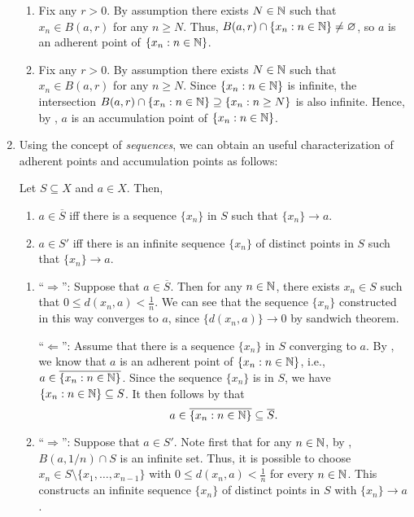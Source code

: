 \begin{enumerate}
\begin{pf}
\begin{enumerate}
\item Fix any \(r>0\). By assumption there exists \(N\in\mathbb{N}\) such that \(x_n\in
B(a,r)\) for any \(n\ge N\). Thus, \(B(a,r)\cap\{x_n:n\in\mathbb{N}\}\ne\varnothing\),
so \(a\) is an adherent point of \(\{x_n:n\in\mathbb{N}\}\).

\item Fix any \(r>0\). By assumption there exists \(N\in\mathbb{N}\) such that \(x_n\in
B(a,r)\) for any \(n\ge N\). Since \(\{x_n:n\in\mathbb{N}\}\) is infinite, the
intersection \(B(a,r)\cap\{x_n:n\in\mathbb{N}\}\supseteq \{x_n:n\ge N\}\) is also
infinite. Hence, by , \(a\) is an accumulation point
of \(\{x_n:n\in\mathbb{N}\}\).
\end{enumerate}
\end{pf}
\item Using the concept of \emph{sequences}, we can obtain an useful
characterization of adherent points and accumulation points as follows:
\begin{proposition}
\label{prp:adher-accum-seq-equiv}
Let \(S\subseteq X\) and \(a\in X\). Then,
\begin{enumerate}
\item \(a\in\overline{S}\) iff there is a sequence \(\{x_n\}\) in \(S\) such
that \(\{x_n\}\to a\).
\item \(a\in S'\) iff there is an infinite sequence \(\{x_n\}\) of distinct
points in \(S\) such that \(\{x_n\}\to a\).
\end{enumerate}
\end{proposition}
\begin{pf}
\begin{enumerate}
\item ``\(\Rightarrow\)'': Suppose that \(a\in \overline{S}\). Then for any
\(n\in\mathbb{N}\), there exists \(x_n\in S\) such that \(\displaystyle
0\le d(x_n,a)<\frac{1}{n}\). We can see that the sequence \(\{x_n\}\) constructed in
this way converges to \(a\), since \(\{d(x_n,a)\}\to 0\) by sandwich theorem.

``\(\Leftarrow\)'': Assume that there is a sequence \(\{x_n\}\) in \(S\)
converging to \(a\). By , we know that \(a\) is an
adherent point of \(\{x_n:n\in\mathbb{N}\}\), i.e., \(a\in\overline{\{x_n:n\in\mathbb{N}\}}\).
Since the sequence \(\{x_n\}\) is in \(S\), we have \(\{x_n:n\in\mathbb{N}\}\subseteq
S\). It then follows by  that
\[a\in\overline{\{x_n:n\in\mathbb{N}\}}\subseteq \overline{S}.\]

\item ``\(\Rightarrow\)'': Suppose that \(a\in S'\). Note first that for any
\(n\in\mathbb{N}\), by , \(B(a,1/n)\cap S\) is an infinite
set. Thus, it is possible to choose \(x_n\in S\setminus
\{x_1,\dotsc,x_{n-1}\}\) with \(\displaystyle 0\le d(x_n,a)<\frac{1}{n}\) for
every \(n\in\mathbb{N}\). This constructs an infinite sequence \(\{x_n\}\) of distinct
points in \(S\) with \(\{x_n\}\to a\).


\end{enumerate}
\end{pf}
\end{enumerate}
